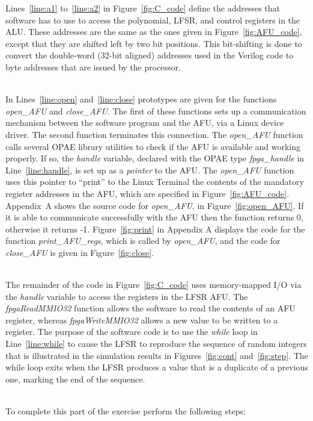 \documentclass[epsfig,10pt,fullpage]{article}
\begin{document}
\noindent
Lines~\ref{line:a1} to~\ref{line:a2} in Figure~\ref{fig:C_code} define the addresses 
that software has to use to
access the polynomial, LFSR, and control registers in the ALU. These addresses are the
same as the ones given in Figure~\ref{fig:AFU_code}, except that they are shifted left by 
two bit positions. This bit-shifting is done to convert the double-word (32-bit aligned)
addresses used in the Verilog code to byte addresses that are issued by the processor.

~\\
\noindent
In Lines~\ref{line:open} and~\ref{line:close} prototypes are given for the functions 
{\it open\_AFU} and {\it close\_AFU}. The first of these functions sets up a communication 
mechanism between the software program and the AFU, via a Linux device driver. The second
function terminates this connection. The {\it open\_AFU} function calls several OPAE library
utilities to check if the AFU is available and working properly. If so, the {\it handle} 
variable, declared with the OPAE type {\it fpga\_handle} in Line~\ref{line:handle}, is 
set up as a {\it pointer} to the AFU. The {\it open\_AFU} function uses this pointer to 
``print'' to the Linux Terminal the contents of the mandatory register addresses in the AFU,
which are specified in Figure~\ref{fig:AFU_code}. Appendix~A shows the source code for
{\it open\_AFU}, in Figure~\ref{fig:open_AFU}. If it is able to communicate successfully with 
the AFU then the function returns 0, otherwise it returns -1. 
Figure~\ref{fig:print} in Appendix A displays the code for the function {\it print\_AFU\_regs}, 
which is called by {\it open\_AFU}, and the code for {\it close\_AFU} is given in
Figure~\ref{fig:close}.

~\\
\noindent
The remainder of the code in Figure~\ref{fig:C_code} uses memory-mapped I/O via the {\it handle}
variable to access the registers in the LFSR AFU. 
The {\it fpgaReadMMIO32} function allows the software to
read the contents of an AFU register, whereas {\it fpgaWriteMMIO32} allows a new value 
to be written to a register. 
The purpose of the software code is to use the {\it while} loop in Line~\ref{line:while} 
to cause the LFSR to reproduce the sequence 
of random integers that is illustrated in the simulation results in
Figures~\ref{fig:cont} and~\ref{fig:step}. The while loop exits when the LFSR produces a
value that is a duplicate of a previous one, marking the end of the sequence. 

~\\
\noindent
To complete this part of the exercise perform the following steps:
\end{document}
